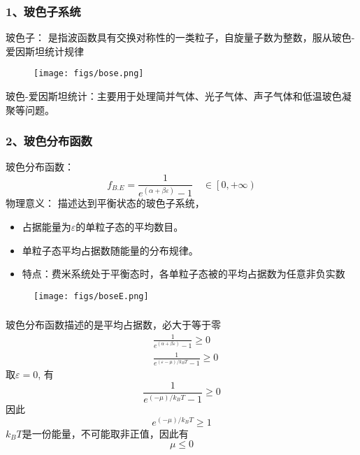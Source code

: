 \begin{frame}
  \frametitle{ 1、玻色子系统}

  \alert{玻色子：} 是指波函数具有交换对称性的一类粒子，自旋量子数为整数，服从玻色-爱因斯坦统计规律
   \begin{figure}[htbp]
    \centering
    \texttt{[image: figs/bose.png]}
   \end{figure}
   \alert{玻色-爱因斯坦统计：}主要用于处理简并气体、光子气体、声子气体和低温玻色凝聚等问题。
\end{frame} 

\begin{frame}
  \frametitle{ 2、玻色分布函数}
  \begin{minipage}[b]{0.49\textwidth}
  \alert{玻色分布函数：} 
  \[f_{B.E} =  \frac{1}{e^{(\alpha +\beta \varepsilon)}-1} \quad \in \left[0,+\infty\right)\]
    \alert{物理意义：} 描述达到平衡状态的玻色子系统，
    \begin{itemize}
      \item 占据能量为$\varepsilon$的单粒子态的平均数目。
      \item 单粒子态平均占据数随能量的分布规律。
      \item 特点：费米系统处于平衡态时，各单粒子态被的平均占据数为任意非负实数
    \end{itemize}
    \end{minipage} 
    \begin{minipage}[b]{0.49\textwidth}
      \begin{figure}[htbp]
        \centering
        \texttt{[image: figs/boseE.png]}
      \end{figure}
      \end{minipage}
\end{frame}  

\begin{frame}
  \frametitle{}
  \证  玻色分布函数描述的是平均占据数，必大于等于零
  \[ \begin{aligned}
    & \frac{1}{e^{(\alpha +\beta \varepsilon)}-1} \ge 0 \\
    &  \frac{1}{e^{(\varepsilon -\mu)/k_B T}-1} \ge 0 
  \end{aligned}\]
  取$\varepsilon =0$, 有 
  \[\frac{1}{e^{( -\mu)/k_B T}-1} \ge 0 \]
  因此
  \[ e^{( -\mu)/k_B T} \ge 1 \]
  $k_B T$是一份能量，不可能取非正值，因此有
  \[ \mu \le 0\]
\end{frame} 

